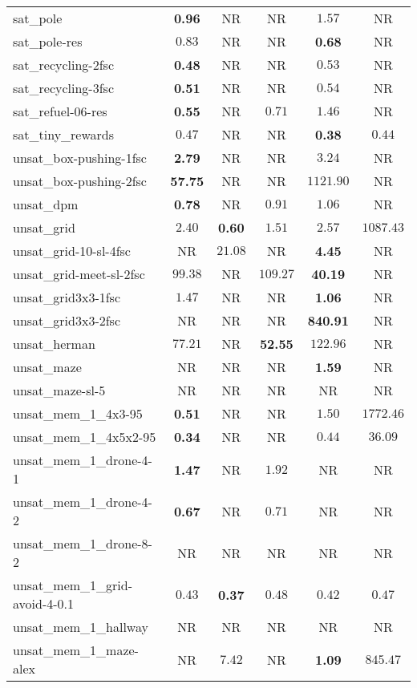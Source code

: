 \begin{tabular}{lccccc}
sat\_pole & \textbf{0.96} & NR & NR & $1.57$ & NR \\
sat\_pole-res & $0.83$ & NR & NR & \textbf{0.68} & NR \\
sat\_recycling-2fsc & \textbf{0.48} & NR & NR & $0.53$ & NR \\
sat\_recycling-3fsc & \textbf{0.51} & NR & NR & $0.54$ & NR \\
sat\_refuel-06-res & \textbf{0.55} & NR & $0.71$ & $1.46$ & NR \\
sat\_tiny\_rewards & $0.47$ & NR & NR & \textbf{0.38} & $0.44$ \\
unsat\_box-pushing-1fsc & \textbf{2.79} & NR & NR & $3.24$ & NR \\
unsat\_box-pushing-2fsc & \textbf{57.75} & NR & NR & $1121.90$ & NR \\
unsat\_dpm & \textbf{0.78} & NR & $0.91$ & $1.06$ & NR \\
unsat\_grid & $2.40$ & \textbf{0.60} & $1.51$ & $2.57$ & $1087.43$ \\
unsat\_grid-10-sl-4fsc & NR & $21.08$ & NR & \textbf{4.45} & NR \\
unsat\_grid-meet-sl-2fsc & $99.38$ & NR & $109.27$ & \textbf{40.19} & NR \\
unsat\_grid3x3-1fsc & $1.47$ & NR & NR & \textbf{1.06} & NR \\
unsat\_grid3x3-2fsc & NR & NR & NR & \textbf{840.91} & NR \\
unsat\_herman & $77.21$ & NR & \textbf{52.55} & $122.96$ & NR \\
unsat\_maze & NR & NR & NR & \textbf{1.59} & NR \\
unsat\_maze-sl-5 & NR & NR & NR & NR & NR \\
unsat\_mem\_1\_4x3-95 & \textbf{0.51} & NR & NR & $1.50$ & $1772.46$ \\
unsat\_mem\_1\_4x5x2-95 & \textbf{0.34} & NR & NR & $0.44$ & $36.09$ \\
unsat\_mem\_1\_drone-4-1 & \textbf{1.47} & NR & $1.92$ & NR & NR \\
unsat\_mem\_1\_drone-4-2 & \textbf{0.67} & NR & $0.71$ & NR & NR \\
unsat\_mem\_1\_drone-8-2 & NR & NR & NR & NR & NR \\
unsat\_mem\_1\_grid-avoid-4-0.1 & $0.43$ & \textbf{0.37} & $0.48$ & $0.42$ & $0.47$ \\
unsat\_mem\_1\_hallway & NR & NR & NR & NR & NR \\
unsat\_mem\_1\_maze-alex & NR & $7.42$ & NR & \textbf{1.09} & $845.47$ \\

\end{tabular}
